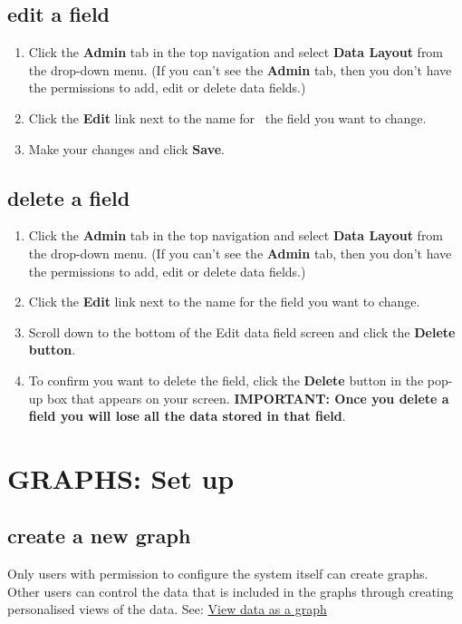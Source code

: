 \documentclass{ctrlo-int-toc}
\begin{document}
\begin{admin}
\subsection[edit a field]{edit a field}
\begin{enumerate}
\item Click the \textbf{Admin} tab in the top navigation and select \textbf{Data Layout} from the drop-down menu. (If you can't see the \textbf{Admin} tab, then you don't have the permissions to add, edit or delete data fields.)
\item Click the \textbf{Edit} link next to the name for \ the field you want to change.
\item Make your changes and click \textbf{Save}.
\end{enumerate}

\bigskip

\subsection[delete a field]{delete a field}
\begin{enumerate}
\item Click the \textbf{Admin} tab in the top navigation and select \textbf{Data Layout} from the drop-down menu. (If you can't see the \textbf{Admin} tab, then you don't have the permissions to add, edit or delete data fields.)
\item Click the \textbf{Edit} link next to the name for the field you want to change.
\item Scroll down to the bottom of the Edit data field screen and click the \textbf{Delete button}.
\item To confirm you want to delete the field, click the \textbf{Delete} button in the pop-up box that appears on your screen. \textbf{IMPORTANT: Once you delete a field you will lose all the data stored in that field}. 
\end{enumerate}
\clearpage\section[GRAPHS: Set up]{GRAPHS: Set up}
\subsection[create a new graph ]{create a new graph }
Only users with permission to configure the system itself can create graphs. Other users can control the data that is included in the graphs through creating personalised views of the data. See: \hyperref[subsec:viewgraph]{View data as a graph}


\end{admin}
\end{document}
